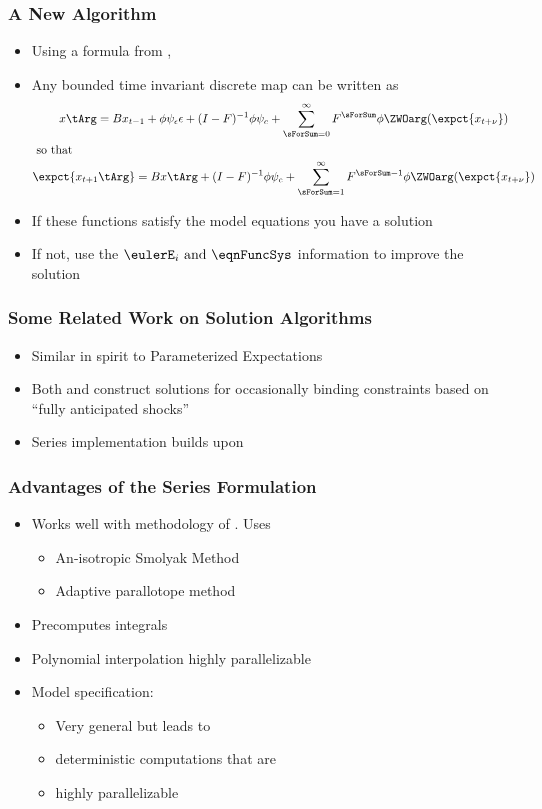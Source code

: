 \documentclass[notheorems]{beamer}
\begin{document}
\begin{frame}
  \frametitle{A New Algorithm}
 {\small  
\begin{itemize}
\item Using a formula from \citep{anderson10},
 \item Any bounded time invariant discrete map can be written as
    \begin{gather*}
      	 x\tArg =B x_{t-1}+ \phi \psi_\epsilon\epsilon + (I - F)^{-1} \phi \psi_c + \sum_{\sForSum=0}^\infty F^\sForSum \phi \ZWOarg(\expct{x_{t+\nu}})\\ \intertext{ so that}
\expct{ x_{t+1}\tArg} =B x\tArg  + (I - F)^{-1} \phi \psi_c+ \sum_{\sForSum =1}^\infty F^{\sForSum-1} \phi \ZWOarg(\expct{x_{t+\nu}}) 
    \end{gather*}
   \item If these functions satisfy the model equations you have a solution
   \item If not, use the $\eulerE_i \text{ and } \eqnFuncSys $ information to improve the solution
  \end{itemize}
}
\end{frame}

\begin{frame}
  \frametitle{Some Related Work on Solution Algorithms}
  \begin{itemize}
\item Similar in spirit to Parameterized Expectations\cite{haan90:_solvin_stoch}
\item Both \cite{holden15:_exist_dsge} and  \cite{guerrieri15:_occbin}
 construct solutions for occasionally binding constraints based on ``fully anticipated shocks''
\item Series implementation builds upon \cite{Judd2014}
  \end{itemize}
\end{frame}

\begin{frame}
  \frametitle{Advantages of the Series Formulation}
  \begin{itemize}
  \item Works well with methodology of  \cite{Judd2014}.  Uses
    \begin{itemize}
    \item An-isotropic Smolyak Method 
    \item Adaptive parallotope method
    \end{itemize}
  \item Precomputes integrals
  \item Polynomial interpolation highly parallelizable
  \item Model specification: 
    \begin{itemize}
    \item Very general  but leads to 
\item deterministic computations that are 
    \item highly parallelizable 
    \end{itemize}
  \end{itemize}
\end{frame}
\end{document}
